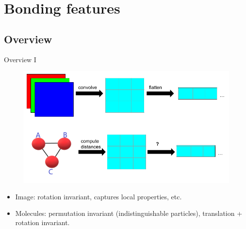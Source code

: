 \documentclass{beamer}
\begin{document}
\section{Bonding features}
\subsection{Overview}
\begin{frame}{Overview I}
    \begin{figure}[H]
        \centering
            \includegraphics[scale=0.3]{img/slide/bonding_features.png}
        \label{fig:bonding_features}
    \end{figure}
    \begin{itemize}
        \item Image: rotation invariant, captures local properties, etc.
        \item Molecules: permutation invariant (indistinguishable particles), translation + rotation invariant.
    \end{itemize}
\end{frame}
\end{document}
